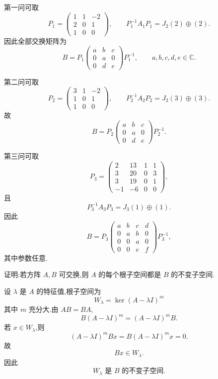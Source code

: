 \begin{solution}
第一问可取
\[
P_1=
\begin{pmatrix}
1&1&-2\\
2&0&1\\
1&0&0
\end{pmatrix},
\qquad
P_1^{-1}A_1P_1
=
J_2(2)\oplus(2).
\]
因此全部交换矩阵为
\[
\boxed{
B=P_1
\begin{pmatrix}
a&b&c\\
0&a&0\\
0&d&e
\end{pmatrix}
P_1^{-1},
\qquad
a,b,c,d,e\in\mathbb{C}.
}
\]

第二问可取
\[
P_2=
\begin{pmatrix}
3&1&-2\\
1&0&1\\
1&0&0
\end{pmatrix},
\qquad
P_2^{-1}A_2P_2
=
J_2(3)\oplus(3).
\]
故
\[
\boxed{
B=P_2
\begin{pmatrix}
a&b&c\\
0&a&0\\
0&d&e
\end{pmatrix}
P_2^{-1}.
}
\]

第三问可取
\[
P_3=
\begin{pmatrix}
2&13&1&1\\
3&20&0&3\\
3&19&0&1\\
-1&-6&0&0
\end{pmatrix},
\]
且
\[
P_3^{-1}A_3P_3
=
J_3(1)\oplus(1).
\]
因此
\[
\boxed{
B=P_3
\begin{pmatrix}
a&b&c&d\\
0&a&b&0\\
0&0&a&0\\
0&0&e&f
\end{pmatrix}
P_3^{-1},
}
\]
其中参数任意.
\end{solution}


\begin{example}
证明:若方阵 $A,B$ 可交换,则 $A$ 的每个根子空间都是 $B$ 的不变子空间.
\end{example}
\exampleblank

\begin{solution}
设 $\lambda$ 是 $A$ 的特征值,根子空间为
\[
W_\lambda=\ker(A-\lambda I)^m
\]
其中 $m$ 充分大.由 $AB=BA$,
\[
B(A-\lambda I)^m
=
(A-\lambda I)^mB.
\]
若 $x\in W_\lambda$,则
\[
(A-\lambda I)^mBx
=
B(A-\lambda I)^mx
=
0.
\]
故
\[
Bx\in W_\lambda.
\]
因此
\[
\boxed{W_\lambda\text{ 是 }B\text{ 的不变子空间}.}
\]
\end{solution}
